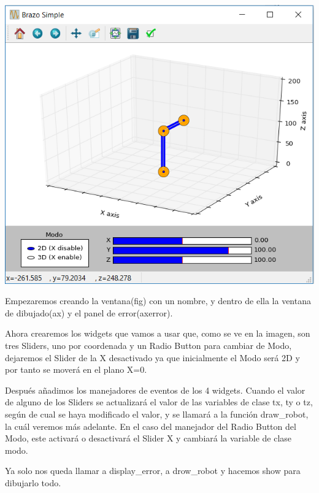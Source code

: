 \includegraphics[scale=0.85]{imagenes/disenio_ventana}

Empezaremos creando la ventana(fig) con un nombre, y dentro de ella la ventana de dibujado(ax) y el panel de error(axerror).



Ahora crearemos los widgets que vamos a usar que, como se ve en la imagen, son tres Sliders, uno por coordenada y un Radio Button para cambiar de Modo, dejaremos el Slider de la X desactivado ya que inicialmente el Modo será 2D y por tanto se moverá en el plano X=0.



Después añadimos los manejadores de eventos de los 4 widgets. Cuando el valor de alguno de los  Sliders se actualizará el valor de las variables de clase tx, ty o tz, según de cual se haya modificado el valor, y se llamará a la función draw\_robot, la cuál veremos más adelante.
En el caso del manejador del Radio Button del Modo, este activará o desactivará el Slider X y cambiará la variable de clase modo.



Ya solo nos queda llamar a display\_error, a drow\_robot y hacemos show para dibujarlo todo.

